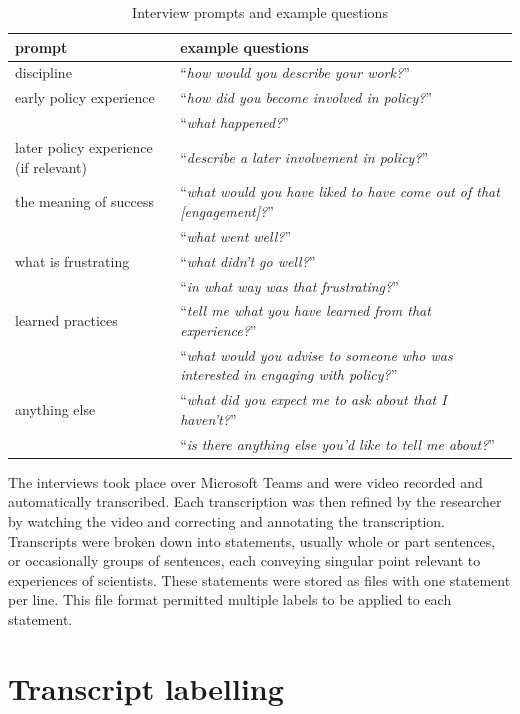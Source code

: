 \begin{table}[!ht]
    \footnotesize
    \caption{Interview prompts and example questions}\label{tab:metinterview}
    \begin{tabular}{L{.4\linewidth}L{.6\linewidth}}  \hline
    \textbf{prompt} & \textbf{example questions} \\ \hline \hline
    discipline & ``\textit{how would you describe your work?}'' \rule[-2ex]{0pt}{6ex}\\
    early policy experience & ``\textit{how did you become involved in policy?}'' \\
     & ``\textit{what happened?}'' \\[2ex]
    later policy experience (if relevant) & ``\textit{describe a later involvement in policy?}'' \\
    the meaning of success & ``\textit{what would you have liked to have come out of that [engagement]?}''\\
     & ``\textit{what went well?}'' \\[2ex]
    what is frustrating & ``\textit{what didn't go well?}'' \\
     & ``\textit{in what way was that frustrating?}''\\[2ex]
    learned practices  & ``\textit{tell me what you have learned from that experience?}'' \\
     & ``\textit{what would you advise to someone who was interested in engaging with policy?}''\\[2ex]
    anything else & ``\textit{what did you expect me to ask about that I haven't?}'' \\
     & ``\textit{is there anything else you'd like to tell me about?}'' \\[2ex] \hline
    \end{tabular}
\end{table}

The interviews took place over Microsoft Teams and were video recorded and automatically transcribed. Each transcription was then refined by the researcher by watching the video and correcting and annotating the transcription. Transcripts were broken down into statements, usually whole or part sentences, or occasionally groups of sentences, each conveying singular point relevant to experiences of scientists. These statements were stored as \CSV{} files with one statement per line. This file format permitted multiple labels to be applied to each statement.

\section{Transcript labelling}\label{sec:metlabelling}

